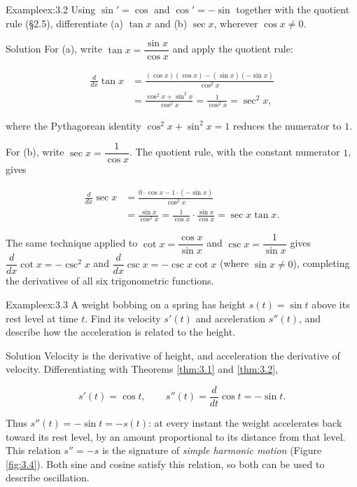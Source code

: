 \documentclass[a4paper,12pt,oneside]{memoir}
\begin{document}
\begin{workedexample}
\begin{envexample}{Example}{ex:3.2}{}
Using \(\sin' = \cos\) and \(\cos' = -\sin\) together with the quotient rule (§2.5), differentiate (a) \(\tan x\) and (b) \(\sec x\), wherever \(\cos x \ne 0\).
\end{envexample}
\begin{envsolution}{Solution}{}{}
For (a), write \(\tan x = \dfrac{\sin x}{\cos x}\) and apply the quotient rule:

\[ \begin{aligned}
          \frac{d}{dx}\tan x
            &= \frac{(\cos x)(\cos x) - (\sin x)(-\sin x)}{\cos^{2} x} \\[2pt]
            &= \frac{\cos^{2} x + \sin^{2} x}{\cos^{2} x}
             = \frac{1}{\cos^{2} x} = \sec^{2} x,
        \end{aligned} \]

where the Pythagorean identity \(\cos^{2} x + \sin^{2} x = 1\) reduces the numerator to \(1\).

For (b), write \(\sec x = \dfrac{1}{\cos x}\). The quotient rule, with the constant numerator \(1\), gives

\[ \begin{aligned}
          \frac{d}{dx}\sec x
            &= \frac{0 \cdot \cos x - 1 \cdot (-\sin x)}{\cos^{2} x} \\[2pt]
            &= \frac{\sin x}{\cos^{2} x}
             = \frac{1}{\cos x}\cdot\frac{\sin x}{\cos x}
             = \sec x \tan x.
        \end{aligned} \]

The same technique applied to \(\cot x = \dfrac{\cos x}{\sin x}\) and \(\csc x = \dfrac{1}{\sin x}\) gives \(\dfrac{d}{dx}\cot x = -\csc^{2} x\) and \(\dfrac{d}{dx}\csc x = -\csc x \cot x\) (where \(\sin x \ne 0\)), completing the derivatives of all six trigonometric functions.
\end{envsolution}
\end{workedexample}
\begin{workedexample}
\begin{envexample}{Example}{ex:3.3}{}
A weight bobbing on a spring has height \(s(t) = \sin t\) above its rest level at time \(t\). Find its velocity \(s'(t)\) and acceleration \(s''(t)\), and describe how the acceleration is related to the height.
\end{envexample}
\begin{envsolution}{Solution}{}{}
Velocity is the derivative of height, and acceleration the derivative of velocity. Differentiating with Theorems \ref{thm:3.1} and \ref{thm:3.2},

\[ s'(t) = \cos t, \qquad s''(t) = \frac{d}{dt}\cos t = -\sin t. \]

Thus \(s''(t) = -\sin t = -s(t)\): at every instant the weight accelerates back toward its rest level, by an amount proportional to its distance from that level. This relation \(s'' = -s\) is the signature of \emph{simple harmonic motion} (Figure \ref{fig:3.4}). Both sine and cosine satisfy this relation, so both can be used to describe oscillation.
\end{envsolution}
\end{workedexample}
\end{document}
